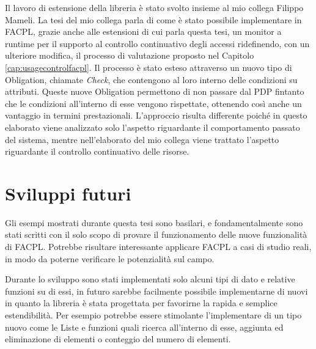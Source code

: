 Il lavoro di estensione della libreria è stato svolto insieme al mio collega Filippo Mameli. La tesi del mio collega parla di come è stato possibile implementare in \ac{FACPL}, grazie anche alle estensioni di cui parla questa tesi, un monitor a runtime per il supporto al controllo continuativo degli accessi ridefinendo, con un ulteriore modifica, il processo di valutazione proposto nel Capitolo \ref{cap:usagecontrolfacpl}. Il processo è stato esteso attraverso un nuovo tipo di Obligation, chiamate \textit{Check}, che contengono al loro interno delle condizioni su attributi. Queste nuove Obligation permettono di non passare dal \ac{PDP} fintanto che le condizioni all'interno di esse vengono rispettate, ottenendo così anche un vantaggio in termini prestazionali. L'approccio risulta differente poiché in questo elaborato viene analizzato solo l'aspetto riguardante il comportamento passato del sistema, mentre nell'elaborato del mio collega viene trattato l'aspetto riguardante il controllo continuativo delle risorse.

\section{Sviluppi futuri}
\label{sec:futuro}

Gli esempi mostrati durante questa tesi sono basilari, e fondamentalmente sono stati scritti con il solo scopo di provare il funzionamento delle nuove funzionalità di \ac{FACPL}. Potrebbe risultare interessante applicare \ac{FACPL} a casi di studio reali, in modo da poterne verificare le potenzialità sul campo.\par
Durante lo sviluppo sono stati implementati solo alcuni tipi di dato e relative funzioni su di essi, in futuro sarebbe facilmente possibile implementarne di nuovi in quanto la libreria è stata
progettata per favorirne la rapida e semplice estendibilità. Per esempio potrebbe essere stimolante l'implementare di un tipo nuovo come le Liste e funzioni quali ricerca all'interno di esse, aggiunta ed eliminazione di elementi o conteggio del numero di elementi.